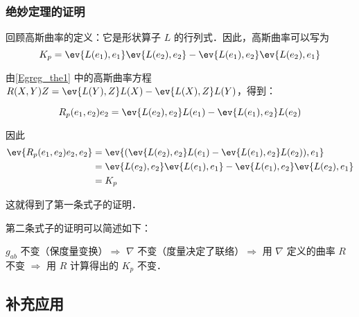 \subsubsection{绝妙定理的证明}

回顾高斯曲率的定义：它是形状算子 $L$ 的行列式．因此，高斯曲率可以写为
\begin{equation}
K_p=\ev{L(e_1), e_1}\ev{L(e_2), e_2}-\ev{L(e_1), e_2}\ev{L(e_2), e_1}
\end{equation}

由\autoref{Egreg_the1} 中的高斯曲率方程 $R(X, Y)Z=\ev{L(Y), Z}L(X)-\ev{L(X), Z}L(Y)$，得到：

\begin{equation}
R_p(e_1, e_2)e_2=\ev{L(e_2), e_2}L(e_1)-\ev{L(e_1), e_2}L(e_2)
\end{equation}

因此
\begin{equation}
\begin{aligned}
\ev{R_p(e_1, e_2)e_2, e_2}&=\ev{(\ev{L(e_2), e_2}L(e_1)-\ev{L(e_1), e_2}L(e_2)), e_1}\\
&=\ev{L(e_2), e_2}\ev{L(e_1), e_1}-\ev{L(e_1), e_2}\ev{L(e_2), e_1}\\
&=K_p
\end{aligned}
\end{equation}

这就得到了第一条式子的证明．

第二条式子的证明可以简述如下：

$g_{ab}$ 不变（保度量变换）$\Rightarrow$ $\nabla$ 不变（度量决定了联络）$\Rightarrow$ 用 $\nabla$ 定义的曲率 $R$ 不变 $\Rightarrow$ 用 $R$ 计算得出的 $K_p$ 不变．



\subsection{补充应用}



